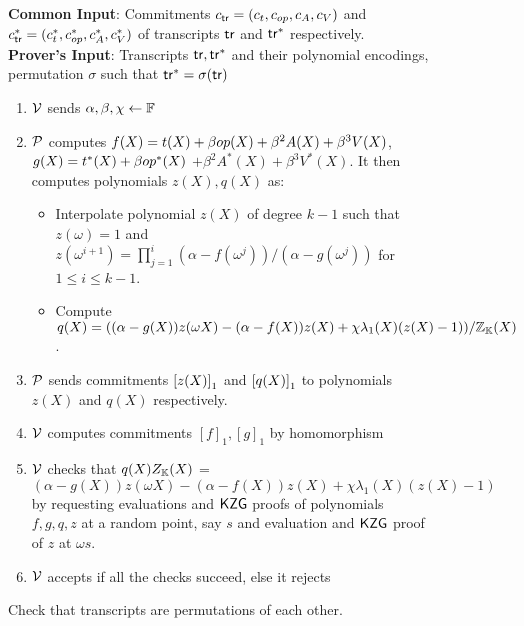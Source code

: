 \begin{figure}[htbp]

    \begin{mdframed}
    {
            {\bf Common Input}: Commitments $c_{\mathsf{tr}}=(c_t,c_{op},c_A, c_V)$ and $c_{\mathsf{tr}}^\ast=(c_t^\ast,c_{op}^\ast, c_A^\ast, c_V^\ast)$
        of transcripts $\mathsf{tr}$ and $\mathsf{tr}^\ast$ respectively.\\
    {\bf Prover's Input}: Transcripts $\mathsf{tr}, \mathsf{tr}^{*}$ and their polynomial encodings, permutation $\sigma$ such that $\mathsf{tr}^{*}=\sigma(\mathsf{tr})$
        \begin{enumerate}[leftmargin=1em, label=\arabic*]
            \item $\mathcal{V}$ sends $\alpha,\beta, \chi\gets \mathbb{F}$
            \item $\mathcal{P}$ computes $f(X)=t(X) + \beta {op}(X) + \beta^2 A(X) + \beta^3 V(X)$, $g(X) = t^\ast(X) + \beta {op}^\ast(X)$
            $+ \beta^2 A^\ast(X) + \beta^3 V^\ast(X)$. It then computes polynomials $z(X),q(X)$ as:
            \begin{itemize}[leftmargin=1em]
                \item Interpolate polynomial $z(X)$ of degree $k-1$ such that $z(\omega)=1$ and
                $z(\omega^{i+1})=\prod_{j=1}^i (\alpha - f(\omega^j))/(\alpha - g(\omega^j))$ for $1\leq i\leq k-1$.
                \item Compute $q(X) = ((\alpha - g(X))z(\omega X) - (\alpha - f(X))z(X) + \chi\lambda_1(X)(z(X) - 1))/\mathbb{Z}_{\mathbb{K}}(X)$.
            \end{itemize}
            \item $\mathcal{P}$ sends commitments $\left[{z(X)}\right]_1$ and $\left[{q(X)}\right]_1$ to polynomials $z(X)$ and $q(X)$ respectively.
            \item $\mathcal{V}$ computes commitments $[f]_1, [g]_1$ by homomorphism
            \item $\mathcal{V}$ checks that $q(X)Z_{\mathbb{K}}(X)$ = $(\alpha - g(X))z(\omega X)-(\alpha - f(X))z(X) + \chi\lambda_1(X)(z(X) - 1)$
            by requesting evaluations and $\mathsf{KZG}$ proofs of polynomials $f,g, q, z$ at a random point, say $s$ and evaluation and $\mathsf{KZG}$ proof of $z$ at $\omega s$.
            \item $\mathcal{V}$ accepts if all the checks succeed, else it rejects
        \end{enumerate}
    }
    \end{mdframed}
    \caption{Check that transcripts are permutations of each other.}
    \label{fig:permutated-transcripts}
\end{figure}

